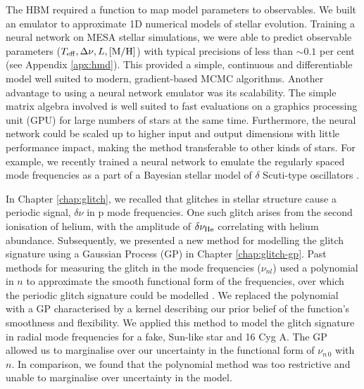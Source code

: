 
The HBM required a function to map model parameters to observables. We built an emulator to approximate 1D numerical models of stellar evolution. Training a neural network on MESA stellar simulations, we were able to predict observable parameters (\({T_\mathrm{eff}}, {\Delta\nu}, L, [\mathrm{M/H}]\)) with typical precisions of less than \(\sim 0.1\) per cent (see Appendix \ref{apx:hmd}). This provided a simple, continuous and differentiable model well suited to modern, gradient-based MCMC algorithms. Another advantage to using a neural network emulator was its scalability. The simple matrix algebra involved is well suited to fast evaluations on a graphics processing unit (GPU) for large numbers of stars at the same time. Furthermore, the neural network could be scaled up to higher input and output dimensions with little performance impact, making the method transferable to other kinds of stars. For example, we recently trained a neural network to emulate the regularly spaced mode frequencies as a part of a Bayesian stellar model of \(\delta\) Scuti-type oscillators \citep{Scutt.Murphy.ea2023}.

In Chapter \ref{chap:glitch}, we recalled that glitches in stellar structure cause a periodic signal, \(\delta\nu\) in p mode frequencies. One such glitch arises from the second ionisation of helium, with the amplitude of \(\delta\nu_{{\mathrm{He}}}\) correlating with helium abundance. Subsequently, we presented a new method for modelling the glitch signature using a Gaussian Process (GP) in Chapter \ref{chap:glitch-gp}. Past methods for measuring the glitch in the mode frequencies (\(\nu_{nl}\)) used a polynomial in \(n\) to approximate the smooth functional form of the frequencies, over which the periodic glitch signature could be modelled \citep[e.g.][]{Mazumdar.Monteiro.ea2014,Verma.Raodeo.ea2019}. We replaced the polynomial with a GP characterised by a kernel describing our prior belief of the function's smoothness and flexibility. We applied this method to model the glitch signature in radial mode frequencies for a fake, Sun-like star and 16 Cyg A. The GP allowed us to marginalise over our uncertainty in the functional form of \(\nu_{n\,0}\) with \(n\). In comparison, we found that the polynomial method was too restrictive and unable to marginalise over uncertainty in the model.

